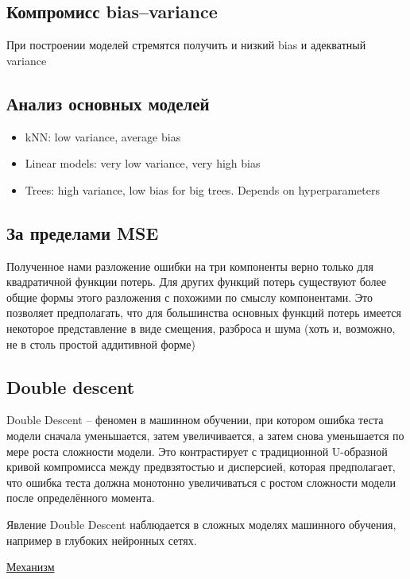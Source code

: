 \subsection{Компромисс bias–variance}

При построении моделей стремятся получить и низкий bias и адекватный variance

\subsection{Анализ основных моделей}

\begin{itemize}
    \item  kNN: low variance, average bias
    \item Linear models: very low variance, very high bias
    \item Trees: high variance, low bias for big trees.
    Depends on hyperparameters
\end{itemize}

\subsection{За пределами MSE}

Полученное нами разложение ошибки на три компоненты верно только для квадратичной функции потерь.
Для других функций потерь существуют более общие формы этого разложения с похожими по смыслу компонентами.
Это позволяет предполагать, что для большинства основных функций потерь имеется некоторое представление в виде
смещения, разброса и шума (хоть и, возможно, не в столь простой аддитивной форме)

\subsection{Double descent}

Double Descent -- феномен в машинном обучении, при котором ошибка теста модели сначала уменьшается, затем
увеличивается, а затем снова уменьшается по мере роста сложности модели.
Это контрастирует с традиционной U-образной кривой компромисса между предвзятостью и дисперсией, которая
предполагает, что ошибка теста должна монотонно увеличиваться с ростом сложности модели после определённого момента.

Явление Double Descent наблюдается в сложных моделях машинного обучения, например в глубоких нейронных сетях.

\underline{Механизм}

